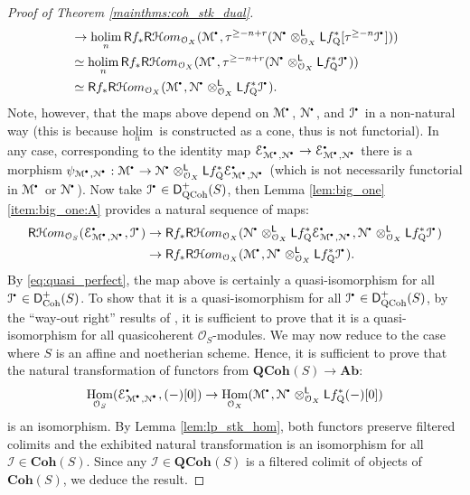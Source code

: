 \documentclass{amsart}
\theoremstyle{plain}
\theoremstyle{definition}
\theoremstyle{remark}
\numberwithin{equation}{section}
\newcommand{\itemref}[1]{\eqref{#1}}
\newcommand{\Orb}{\mathcal{O}}
\newcommand{\COH}[1]{\mathbf{Coh}({#1})}
\newcommand{\QCOHB}{\mathbf{QCoh}}
\newcommand{\QCOH}[2][]{\QCOHB^{#1}({#2})}
\DeclareMathOperator{\Hom}{Hom}
\newcommand{\trunc}[1]{\tau^{{#1}}}
\newcommand{\RDERF}{\mathsf{R}}
\newcommand{\LDERF}{\mathsf{L}}
\newcommand{\DCAT}{\mathsf{D}}
\newcommand{\SHom}{\mathcal{H}om}
\newcommand{\SRHom}{\RDERF\SHom}
\newcommand{\tensor}{\otimes}
\newcommand{\homotopic}{\simeq}
\newcommand{\AB}{\mathbf{Ab}}
\newcommand{\shv}[1]{\mathcal{{#1}}}
\newcommand{\holim}[1]{\underset{#1}{\mathrm{holim}}\,}
\newcommand{\QCPSH}[1]{{#1}_{*}}
\newcommand{\QCPBK}[1]{{#1}_{\mathrm{Q}}^*}
\newcommand{\DQCOH}{\DCAT_{\mathrm{QCoh}}}
\newcommand{\DCOH}{\DCAT_{\mathrm{Coh}}}
\newcommand{\sbt}{\,\begin{picture}(-1,-1)(0,-2)\circle*{1.5}\end{picture}\ }
\newcommand{\cplx}[1]{\shv{{#1}}^{\sbt}}
\begin{document}
\begin{proof}[Proof of Theorem \ref{mainthms:coh_stk_dual}]
\begin{align*}
    &\to \holim{n} \RDERF f_*\SRHom_{\Orb_X}(\cplx{M},\trunc{\geq-
      n+r}(\cplx{N} \tensor_{\Orb_X}^\LDERF \LDERF
    \QCPBK{f}[\trunc{\geq
      -n}\cplx{I}]))\\
    &\homotopic \holim{n} \RDERF f_*\SRHom_{\Orb_X}(\cplx{M},\trunc{\geq
      -n+r}(\cplx{N}
    \tensor_{\Orb_X}^\LDERF \LDERF \QCPBK{f}\cplx{I}))\\
    &\homotopic \RDERF f_*\SRHom_{\Orb_X}(\cplx{M},\cplx{N}
    \tensor_{\Orb_X}^\LDERF \LDERF \QCPBK{f}\cplx{I}).
  \end{align*}
  Note, however, that the maps above depend on $\cplx{M}$, $\cplx{N}$,
  and $\cplx{I}$ in a non-natural way (this is because $\holim{n}$ is
  constructed as a cone, thus is not functorial). In any case,
  corresponding to the identity map $\cplx{E}_{\cplx{M},\cplx{N}} \to
  \cplx{E}_{\cplx{M},\cplx{N}}$ there is a morphism
  $\psi_{\cplx{M},\cplx{N}} : \cplx{M} \to \cplx{N}
  \tensor_{\Orb_X}^\LDERF \LDERF
  \QCPBK{f}\cplx{E}_{\cplx{M},\cplx{N}}$ (which is not necessarily
  functorial in $\cplx{M}$ or $\cplx{N}$).  Now take $\cplx{I} \in
  \DQCOH^+(S)$, then Lemma \ref{lem:big_one}\itemref{item:big_one:A}
  provides a natural sequence of maps:
  \begin{align*}
    \SRHom_{\Orb_S}(\cplx{E}_{\cplx{M},\cplx{N}},\cplx{I}) 
    &\to \RDERF \QCPSH{f} \SRHom_{\Orb_X}(\cplx{N}
    \tensor_{\Orb_X}^\LDERF \LDERF\QCPBK{f}\cplx{E}_{\cplx{M},\cplx{N}},
    \cplx{N} \tensor_{\Orb_X}^\LDERF \LDERF \QCPBK{f}\cplx{I}) \\
    &\to \RDERF \QCPSH{f} \SRHom_{\Orb_X}(\cplx{M},\cplx{N}
    \tensor_{\Orb_X}^\LDERF \LDERF\QCPBK{f}\cplx{I}).
  \end{align*}
  By \eqref{eq:quasi_perfect}, the map above is certainly a
  quasi-isomorphism for all $\cplx{I} \in \DCOH^+(S)$. To 
  show that it is a quasi-isomorphism for all
  $\cplx{I} \in \DQCOH^+(S)$, by the ``way-out right'' results of
  \cite[I.7.1]{MR0222093}, it is sufficient to prove that it is a
  quasi-isomorphism for all quasicoherent $\Orb_S$-modules. We may now
  reduce to the case where $S$ is an affine and noetherian
  scheme. Hence, it is sufficient to prove that the natural
  transformation of functors from $\QCOH{S} \to \AB$:
  \[
  \Hom_{\Orb_S}(\cplx{E}_{\cplx{M},\cplx{N}},(-)[0]) \to
  \Hom_{\Orb_X}(\cplx{M},\cplx{N}\tensor_{\Orb_X}^\LDERF \LDERF \QCPBK{f}(-)[0])
  \]
  is an isomorphism. By Lemma \ref{lem:lp_stk_hom}, both functors
  preserve filtered colimits and the exhibited natural transformation
  is an isomorphism for all $\shv{I} \in \COH{S}$. Since any $\shv{I}
  \in \QCOH{S}$ is a filtered colimit of objects of $\COH{S}$, we
  deduce the result.


\end{proof}
\end{document}
